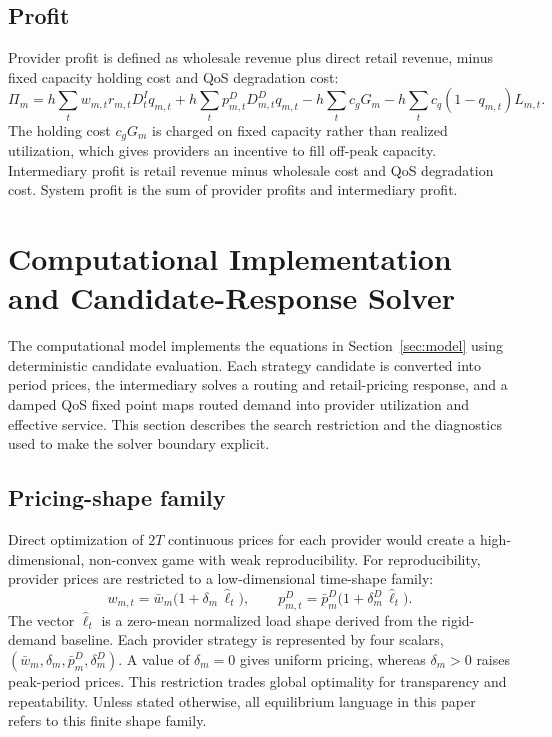 \documentclass[11pt,a4paper]{article}
\newcommand{\D}{D}
\begin{document}
\subsection{Profit}

Provider profit is defined as wholesale revenue plus direct retail revenue, minus fixed capacity holding cost and QoS degradation cost:
\begin{equation}
  \Pi_m=h\!\sum_t\! w_{m,t}r_{m,t}\D^I_t q_{m,t}
  +h\!\sum_t\! p^D_{m,t}\D^D_{m,t}q_{m,t}
  -h\!\sum_t\! c_g G_m
  -h\!\sum_t\! c_q(1-q_{m,t})L_{m,t}.
  \label{eq:firm_profit}
\end{equation}
The holding cost $c_gG_m$ is charged on fixed capacity rather than realized utilization, which gives providers an incentive to fill off-peak capacity. Intermediary profit is retail revenue minus wholesale cost and QoS degradation cost. System profit is the sum of provider profits and intermediary profit.

\section{Computational Implementation and Candidate-Response Solver}
\label{sec:solver}

The computational model implements the equations in Section~\ref{sec:model} using deterministic candidate evaluation. Each strategy candidate is converted into period prices, the intermediary solves a routing and retail-pricing response, and a damped QoS fixed point maps routed demand into provider utilization and effective service. This section describes the search restriction and the diagnostics used to make the solver boundary explicit.

\subsection{Pricing-shape family}

Direct optimization of $2T$ continuous prices for each provider would create a high-dimensional, non-convex game with weak reproducibility. For reproducibility, provider prices are restricted to a low-dimensional time-shape family:
\begin{equation}
  w_{m,t}=\bar w_m\big(1+\delta_m\,\widehat{\ell}_t\big),\qquad
  p^D_{m,t}=\bar p^D_m\big(1+\delta^D_m\,\widehat{\ell}_t\big).
  \label{eq:shape}
\end{equation}
The vector $\widehat{\ell}_t$ is a zero-mean normalized load shape derived from the rigid-demand baseline. Each provider strategy is represented by four scalars, $(\bar w_m,\delta_m,\bar p^D_m,\delta^D_m)$. A value of $\delta_m=0$ gives uniform pricing, whereas $\delta_m>0$ raises peak-period prices. This restriction trades global optimality for transparency and repeatability. Unless stated otherwise, all equilibrium language in this paper refers to this finite shape family.
\end{document}
